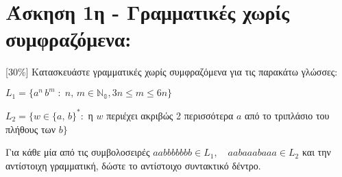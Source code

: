 \section{Άσκηση 1η - Γραμματικές χωρίς συμφραζόμενα:}
\label{sec:Exercise_1}
\doublespacing

[30\%] Κατασκευάστε γραμματικές χωρίς συμφραζόμενα για τις παρακάτω γλώσσες:

\bm{\textcolor{blue}{(α)}} $L_1 = \{a^n\,b^m\; : \;n,\,m \in \mathbb{N_0}, 3n \leq m \leq 6n\}$

\bm{\textcolor{blue}{(β)}} $L_2 = \{w \in \{a,\,b\}^* :$ η $w$ περιέχει ακριβώς 2 περισσότερα $a$ από το τριπλάσιο
του πλήθους των $b\}$

Για κάθε μία από τις συμβολοσειρές $aabbbbbbb \in L_1,\quad aabaaabaaa \in L_2$ και την αντίστοιχη γραμματική,
δώστε το αντίστοιχο συντακτικό δέντρο.
\clearpage